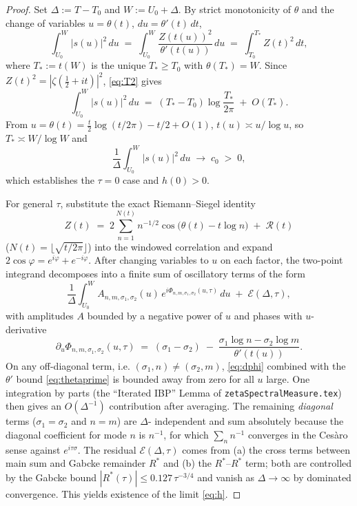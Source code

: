 \documentclass[11pt]{article}
\theoremstyle{definition}
\begin{document}
\begin{proof}
Set $\Delta := T-T_{0}$ and $W := U_{0}+\Delta$. By strict monotonicity of
$\theta$ and the change of variables $u=\theta(t)$, $du=\theta'(t)\,dt$,
\begin{equation}\label{eq:iso}
\int_{U_{0}}^{W}\!|s(u)|^{2}\,du
\;=\; \int_{U_{0}}^{W}\!\frac{Z(t(u))^{2}}{\theta'(t(u))}\,du
\;=\; \int_{T_{0}}^{T_{*}}\!Z(t)^{2}\,dt,
\end{equation}
where $T_{*}:=t(W)$ is the unique $T_{*}\ge T_{0}$ with $\theta(T_{*})=W$.
Since $Z(t)^{2}=|\zeta(\tfrac{1}{2}+it)|^{2}$, \eqref{eq:T2} gives
\[
\int_{U_{0}}^{W}\!|s(u)|^{2}\,du
\;=\; (T_{*}-T_{0})\log\!\frac{T_{*}}{2\pi}\;+\;O(T_{*}).
\]
From $u=\theta(t)=\tfrac{t}{2}\log(t/2\pi)-t/2+O(1)$, $t(u)\asymp u/\log u$,
so $T_{*}\asymp W/\log W$ and
\[
\frac{1}{\Delta}\int_{U_{0}}^{W}\!|s(u)|^{2}\,du \;\longrightarrow\; c_{0}\;>\;0,
\]
which establishes the $\tau=0$ case and $h(0)>0$.

For general $\tau$, substitute the exact Riemann--Siegel identity
\cite[Lemma~3]{exposition}
\[
Z(t) \;=\; 2\sum_{n=1}^{N(t)}n^{-1/2}\cos\!\bigl(\theta(t)-t\log n\bigr)\;+\;\mathcal{R}(t)
\]
($N(t)=\lfloor\sqrt{t/2\pi}\rfloor$) into the windowed correlation and expand
$2\cos\varphi = e^{i\varphi}+e^{-i\varphi}$. After changing variables to $u$
on each factor, the two-point integrand decomposes into a finite sum of
oscillatory terms of the form
\[
\frac{1}{\Delta}\int_{U_{0}}^{W}\!A_{n,m,\sigma_{1},\sigma_{2}}(u)\,
e^{i\Phi_{n,m,\sigma_{1},\sigma_{2}}(u,\tau)}\,du \;+\;\mathcal{E}(\Delta,\tau),
\]
with amplitudes $A$ bounded by a negative power of $u$ and phases with
$u$-derivative
\begin{equation}\label{eq:dphi}
\partial_{u}\Phi_{n,m,\sigma_{1},\sigma_{2}}(u,\tau)
\;=\; (\sigma_{1}-\sigma_{2})\;-\;\frac{\sigma_{1}\log n-\sigma_{2}\log m}{\theta'(t(u))}.
\end{equation}
On any off-diagonal term, i.e. $(\sigma_{1},n)\ne(\sigma_{2},m)$,
\eqref{eq:dphi} combined with the $\theta'$ bound \eqref{eq:thetaprime}
is bounded away from zero for all $u$ large. One integration by parts
(the ``Iterated IBP'' Lemma of \texttt{zetaSpectralMeasure.tex}) then gives
an $O(\Delta^{-1})$ contribution after averaging. The remaining
\emph{diagonal} terms ($\sigma_{1}=\sigma_{2}$ and $n=m$) are $\Delta$-
independent and sum absolutely because the diagonal coefficient for mode
$n$ is $n^{-1}$, for which $\sum_{n}n^{-1}$ converges in the Cesàro sense
against $e^{i\tau\sigma}$. The residual $\mathcal{E}(\Delta,\tau)$ comes
from (a) the cross terms between main sum and Gabcke remainder $R^{*}$
\cite[Lemma~6]{exposition} and (b) the $R^{*}$--$R^{*}$ term; both are
controlled by the Gabcke bound $|R^{*}(\tau)|\le 0.127\,\tau^{-3/4}$ and
vanish as $\Delta\to\infty$ by dominated convergence. This yields
existence of the limit \eqref{eq:h}.


\end{proof}
\end{document}
